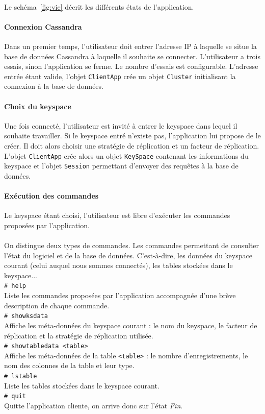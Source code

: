 \documentclass[12pt]{article}
\newcommand{\class}[1]{\texttt{#1}}
\newcommand{\shellcmd}[1]{\\\indent\indent\texttt{\footnotesize\# #1}\\}
\begin{document}
\paragraph{} Le schéma~\ref{fig:vie} décrit les différents états de l'application.

\paragraph{Connexion Cassandra} Dans un premier temps, l'utilisateur doit entrer l'adresse IP à laquelle se situe la base de données Cassandra à laquelle il souhaite se connecter.
L'utilisateur a trois essais, sinon l'application se ferme. Le nombre d'essais est configurable. L'adresse entrée étant valide, 
l'objet \class{ClientApp} crée un objet \class{Cluster} initialisant la connexion à la base de données.

\paragraph{Choix du keyspace} Une fois connecté, l'utilisateur est invité à entrer le keyspace dans lequel il souhaite travailler. Si le keyspace entré n'existe pas, l'application lui propose de le créer. Il doit alors choisir une stratégie de réplication et un facteur de réplication.
L'objet \class{ClientApp} crée alors un objet \class{KeySpace} contenant les informations du keyspace et l'objet \class{Session} permettant d'envoyer des requêtes à la base de données.


\paragraph{Exécution des commandes} Le keyspace étant choisi, l'utilisateur est libre d'exécuter les commandes proposées par l'application.
\paragraph{} On distingue deux types de commandes. Les commandes permettant de consulter l'état du logiciel et de la base de données. 
C'est-à-dire, les données du keyspace courant (celui auquel nous sommes connectés), les tables stockées dans le keyspace...
\newline
\shellcmd{help}
Liste les commandes proposées par l'application accompagnée d'une brève description de chaque commande.
\shellcmd{showksdata}
Affiche les méta-données du keyspace courant : le nom du keyspace, le facteur de réplication et la stratégie de réplication utilisée.
\shellcmd{showtabledata <table>}
Affiche les méta-données de la table \texttt{<table>} : le nombre d'enregistrements, le nom des colonnes de la table et leur type.
\shellcmd{lstable}
Liste les tables stockées dans le keyspace courant.
\shellcmd{quit}
Quitte l'application cliente, on arrive donc sur l'état \textit{Fin}.
\end{document}
